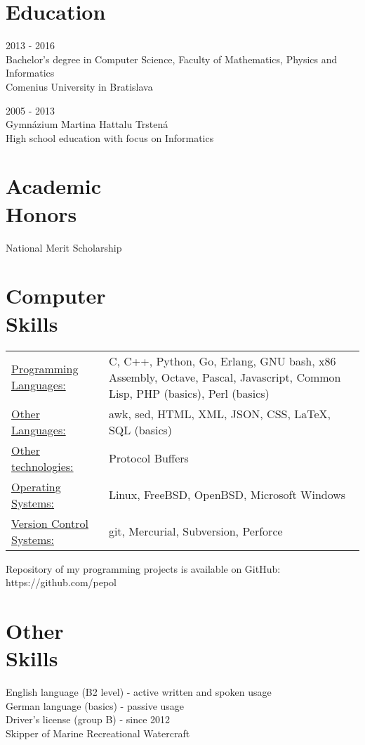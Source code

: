 \documentclass[margin]{res}
\begin{document}
\begin{resume}
\section{Education}
2013 - 2016 \\
Bachelor's degree in Computer Science, Faculty of Mathematics, Physics and Informatics \\
Comenius University in Bratislava

2005 - 2013 \\
Gymn\'{a}zium Martina Hattalu Trsten\'{a} \\
High school education with focus on Informatics

\section{Academic \\ Honors}
National Merit Scholarship

\section{Computer \\ Skills}
   \begin{tabular}{l p{3in}}
       \underline{Programming Languages:} & C, C++, Python, Go, Erlang, GNU bash, x86 Assembly, Octave, Pascal, Javascript, Common Lisp, PHP (basics), Perl (basics) \\
       \underline{Other Languages:} & awk, sed, HTML, XML, JSON, CSS, \LaTeX, SQL (basics) \\

       \underline{Other technologies:} & Protocol Buffers \\
       \underline{Operating Systems:} & Linux, FreeBSD, OpenBSD, Microsoft Windows \\
       \underline{Version Control Systems:} & git, Mercurial, Subversion, Perforce
 \end{tabular}

Repository of my programming projects is available on GitHub: https://github.com/pepol

\section{Other \\ Skills}
English language (B2 level) - active written and spoken usage \\
German language (basics) - passive usage \\
Driver's license (group B) - since 2012 \\
Skipper of Marine Recreational Watercraft


\end{resume}
\end{document}

